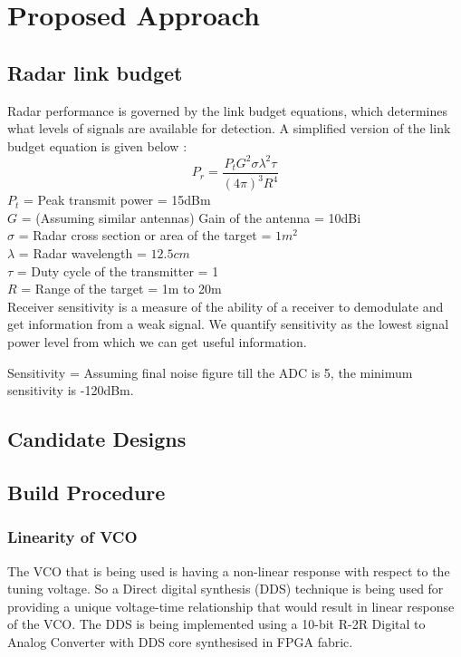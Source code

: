 \chapter{Proposed Approach}
\section{Radar link budget}
Radar performance is governed by the link budget equations, which determines what levels of signals are available for detection. A simplified version of the link budget equation is given below :
\begin{equation}
P_r = \frac{P_tG^2\sigma{}\lambda^2\tau}{(4\pi)^3R^4}
\end{equation}
$P_t$ = Peak transmit power = 15dBm\\
$G$ = (Assuming similar antennas) Gain of the antenna = 10dBi\\
$\sigma$ = Radar cross section or area of the target = $1m^2$\\
$\lambda$ = Radar wavelength = $12.5cm$\\
$\tau$ = Duty cycle of the transmitter = 1\\
$R$ = Range of the target = 1m to 20m\\

Receiver sensitivity is a measure of the ability of a receiver to demodulate and get information from a weak signal. We quantify sensitivity as the lowest signal power level from which we can get useful information.

Sensitivity = 
Assuming final noise figure till the ADC is 5, the minimum sensitivity is -120dBm. 
\section{Candidate Designs}
\section{Build Procedure}
	\subsection{Linearity of VCO}
	The VCO that is being used is having a non-linear response with respect to the tuning voltage. So a Direct digital synthesis (DDS) technique is being used for providing a unique voltage-time relationship that would result in linear response of the VCO. The DDS is being implemented using a 10-bit R-2R Digital to Analog Converter with DDS core synthesised in FPGA fabric. 
